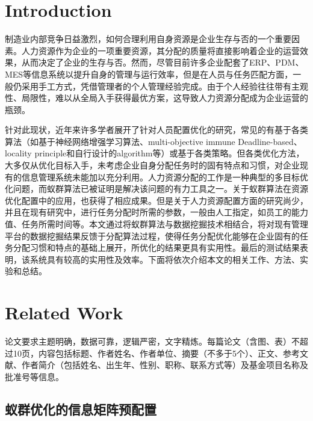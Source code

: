 \documentclass{seu-report}
\begin{document}
\twocolumn[\makeheader]

\makeauthorinfo

\section{Introduction}

制造业内部竞争日益激烈，如何合理利用自身资源是企业生存与否的一个重要因素。人力资源作为企业的一项重要资源，其分配的质量将直接影响着企业的运营效果，从而决定了企业的生存与否。然而，尽管目前许多企业配套了ERP、PDM、MES等信息系统以提升自身的管理与运行效率，但是在人员与任务匹配方面，一般仍采用手工方式，凭借管理者的个人管理经验完成。由于个人经验往往带有主观性、局限性，难以从全局入手获得最优方案，这导致人力资源分配成为企业运营的瓶颈。

针对此现状，近年来许多学者展开了针对人员配置优化的研究，常见的有基于各类算法（如基于神经网络增强学习算法、multi-objective immune Deadline-based、locality principle和自行设计的algorithm等）或基于各类策略。但各类优化方法，大多仅从优化目标入手，未考虑企业自身分配任务时的固有特点和习惯，对企业现有的信息管理系统未能加以充分利用。人力资源分配的工作是一种典型的多目标优化问题，而蚁群算法已被证明是解决该问题的有力工具之一。关于蚁群算法在资源优化配置中的应用，也获得了相应成果。但是关于人力资源配置方面的研究尚少，并且在现有研究中，进行任务分配时所需的参数，一般由人工指定，如员工的能力值、任务所需时间等。本文通过将蚁群算法与数据挖掘技术相结合，将对现有管理平台的数据挖掘结果反馈于分配算法过程，使得任务分配优化能够在企业固有的任务分配习惯和特点的基础上展开，所优化的结果更具有实用性。最后的测试结果表明，该系统具有较高的实用性及效率。下面将依次介绍本文的相关工作、方法、实验和总结。


\section{Related Work}

论文要求主题明确，数据可靠，逻辑严密，文字精炼。每篇论文（含图、表）不超过10页，内容包括标题、作者姓名、作者单位、摘要（不多于5个）、正文、参考文献、作者简介（包括姓名、出生年、性别、职称、联系方式等）及基金项目名称及批准号等信息。

\subsection{蚁群优化的信息矩阵预配置}
\end{document}
